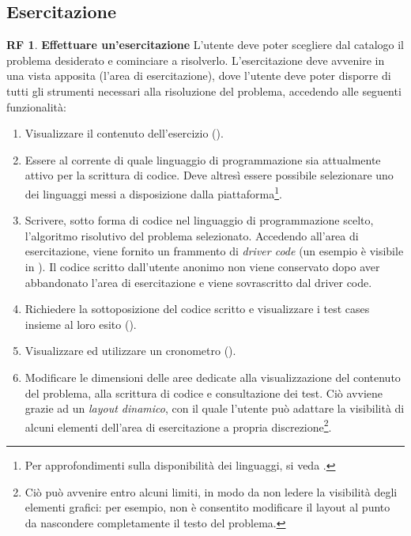 \documentclass[11pt, a4paper]{article}
\theoremstyle{definition}
\newtheorem{funcreq}{RF} %
\begin{document}
\subsection{Esercitazione}\label{secesercitazione}
\begin{funcreq}
\label{exesession}
\textbf{Effettuare un'esercitazione }
L'utente deve poter scegliere dal catalogo il problema desiderato e cominciare
a risolverlo. L'esercitazione deve avvenire in una vista apposita (l'area di
esercitazione), dove l'utente deve poter disporre di tutti gli strumenti
necessari alla risoluzione del problema, accedendo alle seguenti funzionalità:
\begin{enumerate}
    \item Visualizzare il contenuto dell'esercizio (\textcolor{blue}{}).

    \item Essere al corrente di quale linguaggio di programmazione sia
    attualmente attivo per la scrittura di codice. Deve altresì essere 
    possibile selezionare uno dei linguaggi messi a disposizione dalla
    piattaforma\footnote{Per approfondimenti sulla disponibilità dei
    linguaggi, si veda \textcolor{blue}{}.}.

    \item Scrivere, sotto forma di codice nel linguaggio di programmazione
    scelto, l'algoritmo risolutivo del problema selezionato. Accedendo all'area
    di esercitazione, viene fornito un frammento di \textit{driver code}
    (un esempio è visibile in \textcolor{blue}{}).
    Il codice scritto dall'utente anonimo non viene conservato dopo aver
    abbandonato l'area di esercitazione e viene sovrascritto dal driver
    code.

    \item Richiedere la sottoposizione del codice scritto e visualizzare i test cases insieme al loro esito (\textcolor{blue}{}).

    \item Visualizzare ed utilizzare un cronometro (\textcolor{blue}{}).
    
    \item Modificare le dimensioni delle aree dedicate
    alla visualizzazione del contenuto del problema, alla scrittura di codice
    e consultazione dei test. Ciò avviene grazie ad un \textit{layout dinamico},
    con il quale l'utente può adattare la visibilità di alcuni elementi
    dell'area di esercitazione a propria discrezione\footnote{Ciò può avvenire entro alcuni limiti,
    in modo da non ledere la visibilità degli elementi grafici: per esempio, non è consentito modificare
    il layout al punto da nascondere completamente il testo del problema.}.
\end{enumerate}
\end{funcreq}
\end{document}
